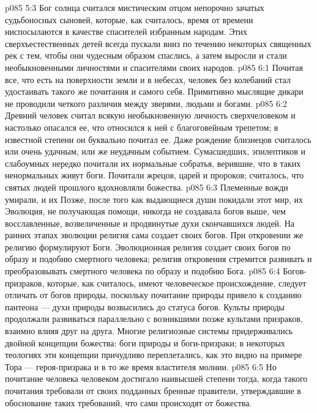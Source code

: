 \vs p085 5:3 Бог солнца считался мистическим отцом непорочно зачатых судьбоносных сыновей, которые, как считалось, время от времени ниспосылаются в качестве спасителей избранным народам. Этих сверхъестественных детей всегда пускали вниз по течению некоторых священных рек с тем, чтобы они чудесным образом спаслись, а затем выросли и стали необыкновенными личностями и спасителями своих народов.
\vs p085 6:1 Почитая все, что есть на поверхности земли и в небесах, человек без колебаний стал удостаивать такого же почитания и самого себя. Примитивно мыслящие дикари не проводили четкого различия между зверями, людьми и богами.
\vs p085 6:2 Древний человек считал всякую необыкновенную личность сверхчеловеком и настолько опасался ее, что относился к ней с благоговейным трепетом; в известной степени он буквально почитал ее. Даже рождение близнецов считалось или очень удачным, или же неудачным событием. Сумасшедших, эпилептиков и слабоумных нередко почитали их нормальные собратья, верившие, что в таких ненормальных живут боги. Почитали жрецов, царей и пророков; считалось, что святых людей прошлого вдохновляли божества.
\vs p085 6:3 Племенные вожди умирали, и их  Позже, после того как выдающиеся души покидали этот мир, их  Эволюция, не получающая помощи, никогда не создавала богов выше, чем восславленные, возвеличенные и продвинутые духи скончавшихся людей. На ранних этапах эволюции религия сама создает своих богов. При откровении же религию формулируют Боги. Эволюционная религия создает своих богов по образу и подобию смертного человека; религия откровения стремится развивать и преобразовывать смертного человека по образу и подобию Бога.
\vs p085 6:4 Богов\hyp{}призраков, которые, как считалось, имеют человеческое происхождение, следует отличать от богов природы, поскольку почитание природы привело к созданию пантеона --- духи природы возвысились до статуса богов. Культы природы продолжали развиваться параллельно с возникшими позже культами призраков, взаимно влияя друг на друга. Многие религиозные системы придерживались двойной концепции божества: боги природы и боги\hyp{}призраки; в некоторых теологиях эти концепции причудливо переплетались, как это видно на примере Тора --- героя\hyp{}призрака и в то же время властителя молнии.
\vs p085 6:5 Но почитание человека человеком достигало наивысшей степени тогда, когда такого почитания требовали от своих подданных бренные правители, утверждавшие в обоснование таких требований, что сами происходят от божества.
